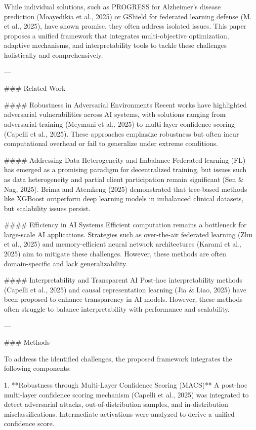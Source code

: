 While individual solutions, such as PROGRESS for Alzheimer’s disease prediction (Moayedikia et al., 2025) or GShield for federated learning defense (M. et al., 2025), have shown promise, they often address isolated issues. This paper proposes a unified framework that integrates multi-objective optimization, adaptive mechanisms, and interpretability tools to tackle these challenges holistically and comprehensively.

---

### Related Work  

#### Robustness in Adversarial Environments  
Recent works have highlighted adversarial vulnerabilities across AI systems, with solutions ranging from adversarial training (Meymani et al., 2025) to multi-layer confidence scoring (Capelli et al., 2025). These approaches emphasize robustness but often incur computational overhead or fail to generalize under extreme conditions. 

#### Addressing Data Heterogeneity and Imbalance  
Federated learning (FL) has emerged as a promising paradigm for decentralized training, but issues such as data heterogeneity and partial client participation remain significant (Sen & Nag, 2025). Brima and Atemkeng (2025) demonstrated that tree-based methods like XGBoost outperform deep learning models in imbalanced clinical datasets, but scalability issues persist.

#### Efficiency in AI Systems  
Efficient computation remains a bottleneck for large-scale AI applications. Strategies such as over-the-air federated learning (Zhu et al., 2025) and memory-efficient neural network architectures (Karami et al., 2025) aim to mitigate these challenges. However, these methods are often domain-specific and lack generalizability.

#### Interpretability and Transparent AI  
Post-hoc interpretability methods (Capelli et al., 2025) and causal representation learning (Jia & Liao, 2025) have been proposed to enhance transparency in AI models. However, these methods often struggle to balance interpretability with performance and scalability.

---

### Methods  

To address the identified challenges, the proposed framework integrates the following components:

1. **Robustness through Multi-Layer Confidence Scoring (MACS)**  
   A post-hoc multi-layer confidence scoring mechanism (Capelli et al., 2025) was integrated to detect adversarial attacks, out-of-distribution samples, and in-distribution misclassifications. Intermediate activations were analyzed to derive a unified confidence score.

